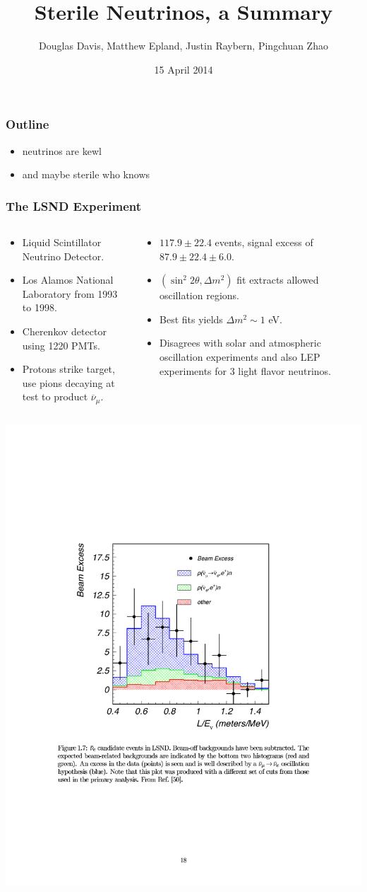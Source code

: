 \documentclass[mathserif,18pt,xcolor=table]{beamer}
\title[PHY 505 Project 3]{Sterile Neutrinos, a Summary}
\author[DD, ME, JR, PZ]{{\small Douglas Davis, Matthew Epland, Justin Raybern, Pingchuan Zhao}}
\institute{\it{Duke University} \\ \mbox{} \\ \mbox{} \\ \pgfuseimage{dukelogo}}
\date[15 April 2014]{15 April 2014}
\begin{document}
\beamertemplateballitem
\frame{\titlepage}

\begin{frame}
  \frametitle{Outline}
  \begin{itemize}
  \item neutrinos are kewl
  \item and maybe sterile who knows
  \end{itemize}
\end{frame}

\begin{frame}
  \frametitle{The LSND Experiment}
  \footnotesize{
    \begin{columns}
      \begin{column}{.5\linewidth}      
        \begin{itemize}
        \item Liquid Scintillator Neutrino Detector.
        \item Los Alamos National Laboratory from 1993 to 1998.
        \item Cherenkov detector using 1220 PMTs.
        \item Protons strike target, use pions decaying at test to product $\overline{\nu}_\mu$.
        \end{itemize}
      \end{column}
      \begin{column}{.5\linewidth}
        \begin{itemize}
        \item $117.9 \pm 22.4$ events, signal excess of $87.9\pm 22.4 \pm 6.0$.
        \item $(\sin^2 2\theta,\Delta m^2)$ fit extracts allowed oscillation regions.
        \item Best fits yields $\Delta m^2 \sim 1$ eV.
        \item Disagrees with solar and atmospheric oscillation experiments and also LEP experiments for 3 light flavor neutrinos.
        \end{itemize}
      \end{column}
    \end{columns}
  }
  \begin{center}
    \includegraphics[width=.35\linewidth]{../figures/LSND_plot.pdf}
  \end{center}
\end{frame}
\end{document}
